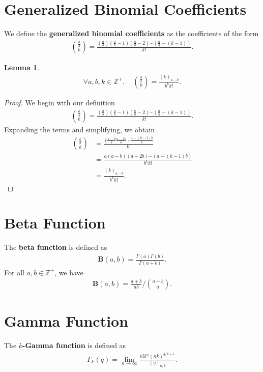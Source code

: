 \documentclass[10pt,a4paper]{article}
\theoremstyle{plain}
\newtheorem{lemma}{Lemma}[section]
\newcommand{\Z}{\mathbb{Z}}
\begin{document}
\section{Generalized Binomial Coefficients}
We define the \textbf{generalized binomial coefficients} as the coefficients of the form
\begin{align}
\binom{\frac{a}{b}}{k} = \frac{\left(\frac{a}{b}\right)\left(\frac{a}{b} - 1\right)\left(\frac{a}{b} - 2\right) \cdots \left(\frac{a}{b} - (k-1)\right)}{k!} .
\end{align}
\begin{lemma} \label{proof:genbinomial1}
\begin{align*}
\forall a,b,k \in \Z^+, \quad
\binom{\frac{a}{b}}{k} = \frac{(k)_{a,-b}}{b^k k!} .
\end{align*}
\end{lemma}
\begin{proof}
We begin with our definition
\begin{align*}
\binom{\frac{a}{b}}{k} = \frac{\left(\frac{a}{b}\right)\left(\frac{a}{b} - 1\right)\left(\frac{a}{b} - 2\right) \cdots \left(\frac{a}{b} - (k-1)\right)}{k!} .
\end{align*}
Expanding the terms and simplifying, we obtain
\begin{align*}
\binom{\frac{a}{b}}{k} &= \frac{\frac{a}{b} \frac{a-b}{b} \frac{a-2b}{b} \cdots \frac{a-(k-1)b}{b}}{k!} \\
&= \frac{a (a - b) (a - 2b) \cdots (a - (k-1)b)}{b^k k!} \\
&= \frac{(k)_{a,-b}}{b^k k!} .
\end{align*}
\end{proof}

\section{Beta Function}
The \textbf{beta function} is defined as
\begin{align}
\textbf{B}(a,b) = \frac{\Gamma(a)\Gamma(b)}{\Gamma(a+b)} . 
\end{align}
For all $a,b \in \Z^+$, we have
\begin{align}
\textbf{B}(a,b) = \frac{a+b}{ab} \Bigg/ \binom{a+b}{a} . 
\end{align}

\section{Gamma Function}
The \textbf{$k$-Gamma function} \cite{diaz2005hypergeometric} is defined as 
\begin{align*}
\Gamma_k(q) = \lim_{n\to\infty} \frac{n! k^n (nk)^{q/k-1}}{(q)_{n,k}} .
\end{align*}
\end{document}
